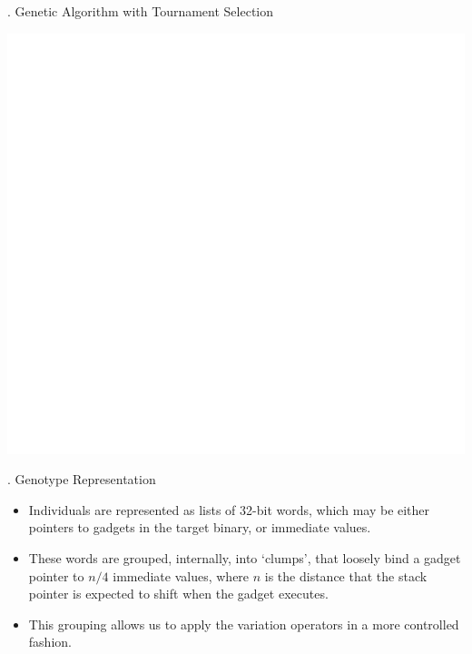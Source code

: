 \documentclass[9pt]{beamer}
\begin{document}
\begin{frame}{\theframenumber. Genetic Algorithm with Tournament Selection}
  \begin{center}
  \includegraphics[height=.85\textheight,width=\textwidth]{../images/tournament.png}
  \end{center}
\end{frame}

\begin{frame}{\theframenumber. Genotype Representation}
  \begin{itemize}
    \item Individuals are represented as lists of 32-bit words, which may be either pointers to gadgets in the target binary, or immediate values.
    \item These words are grouped, internally, into `clumps', that loosely bind a gadget pointer to $n/4$ immediate values, where $n$ is the distance that the stack pointer is expected to shift when the gadget executes.
    \item This grouping allows us to apply the variation operators in a more controlled fashion.
  \end{itemize}
\end{frame}
\end{document}
